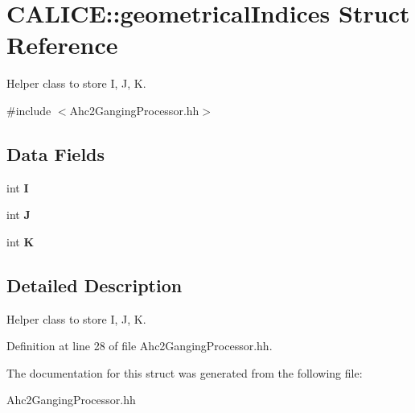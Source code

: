 \section{C\-A\-L\-I\-C\-E\-:\-:geometrical\-Indices Struct Reference}
\label{structCALICE_1_1geometricalIndices}


Helper class to store I, J, K.  




{\ttfamily \#include $<$Ahc2\-Ganging\-Processor.\-hh$>$}

\subsection*{Data Fields}
\begin{DoxyCompactItemize}
\item 
int {\bfseries I}\label{structCALICE_1_1geometricalIndices_a169eb9cf47d6ad4dc508e712e7a39ee9}

\item 
int {\bfseries J}\label{structCALICE_1_1geometricalIndices_a0dd42ea7ba3919a89f2ffcb8f81010a7}

\item 
int {\bfseries K}\label{structCALICE_1_1geometricalIndices_ab61a6aed9ef9f3aa82f0cb971386a2aa}

\end{DoxyCompactItemize}


\subsection{Detailed Description}
Helper class to store I, J, K. 

Definition at line 28 of file Ahc2\-Ganging\-Processor.\-hh.



The documentation for this struct was generated from the following file\-:\begin{DoxyCompactItemize}
\item 
Ahc2\-Ganging\-Processor.\-hh\end{DoxyCompactItemize}
